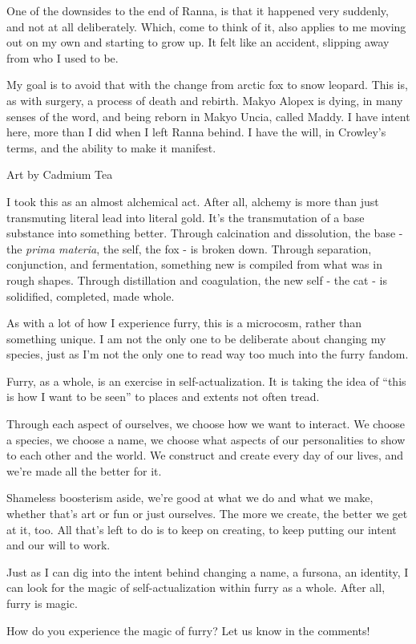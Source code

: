 One of the downsides to the end of Ranna, is that it happened very suddenly, and not at all deliberately. Which, come to think of it, also applies to me moving out on my own and starting to grow up. It felt like an accident, slipping away from who I used to be.

My goal is to avoid that with the change from arctic fox to snow leopard. This is, as with surgery, a process of death and rebirth. Makyo Alopex is dying, in many senses of the word, and being reborn in Makyo Uncia, called Maddy. I have intent here, more than I did when I left Ranna behind. I have the will, in Crowley's terms, and the ability to make it manifest.

Art by Cadmium Tea

I took this as an almost alchemical act. After all, alchemy is more than just transmuting literal lead into literal gold. It's the transmutation of a base substance into something better. Through calcination and dissolution, the base - the \emph{prima materia}, the self, the fox - is broken down. Through separation, conjunction, and fermentation, something new is compiled from what was in rough shapes. Through distillation and coagulation, the new self - the cat - is solidified, completed, made whole.

As with a lot of how I experience furry, this is a microcosm, rather than something unique. I am not the only one to be deliberate about changing my species, just as I'm not the only one to read way too much into the furry fandom.

Furry, as a whole, is an exercise in self-actualization. It is taking the idea of ``this is how I want to be seen'' to places and extents not often tread.

Through each aspect of ourselves, we choose how we want to interact. We choose a species, we choose a name, we choose what aspects of our personalities to show to each other and the world. We construct and create every day of our lives, and we're made all the better for it.

Shameless boosterism aside, we're good at what we do and what we make, whether that's art or fun or just ourselves. The more we create, the better we get at it, too. All that's left to do is to keep on creating, to keep putting our intent and our will to work.

Just as I can dig into the intent behind changing a name, a fursona, an identity, I can look for the magic of self-actualization within furry as a whole. After all, furry is magic.

How do you experience the magic of furry? Let us know in the comments!
